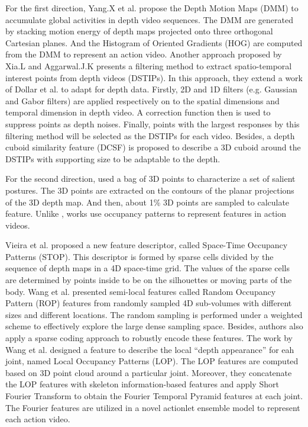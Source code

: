 \documentclass[final,3p,times,twocolumn]{elsarticle}
\begin{document}
For the first direction, Yang.X et al. \cite{yang2012recognizing} propose the Depth Motion Maps (DMM) to accumulate global activities in depth video sequences. The DMM are generated by stacking motion energy of depth maps projected onto three orthogonal Cartesian planes. And the Histogram of Oriented Gradients (HOG) \cite{dalal2005histograms} are computed from the DMM to represent an action video. Another approach proposed by Xia.L and Aggarwal.J.K \cite{xia2013spatio} presents a filtering method to extract spatio-temporal interest points from depth videos (DSTIPs). In this approach, they extend a work of Dollar et al. \cite{dollar2005behavior} to adapt for depth data. Firstly, 2D and 1D filters (e.g. Gaussian and Gabor filters) are applied respectively on to the spatial dimensions and temporal dimension in depth video. A correction function then is used to suppress points as depth noises. Finally, points with the largest responses by this filtering method will be selected as the DSTIPs for each video. Besides, a depth cuboid similarity feature (DCSF) is proposed to describe a 3D cuboid around the DSTIPs with supporting size to be adaptable to the depth.

For the second direction, \cite{li2010action} used a bag of 3D points to characterize a set of salient postures. The 3D points are extracted on the contours of the planar projections of the 3D depth map. And then, about 1\% 3D points are sampled to calculate feature. Unlike \cite{li2010action}, works \cite{vieira2012stop, wang2012robust, wang2012mining} use occupancy patterns to represent features in action videos.

Vieira et al. \cite{vieira2012stop} proposed a new feature descriptor, called Space-Time Occupancy Patterns (STOP). This descriptor is formed by sparse cells divided by the sequence of depth maps in a 4D space-time grid. The values of the sparse cells are determined by points inside to be on the silhouettes or moving parts of the body. Wang et al. \cite{wang2012robust} presented semi-local features called Random Occupancy Pattern (ROP) features from randomly sampled 4D sub-volumes with different sizes and different locations. The random sampling is performed under a weighted scheme to effectively explore the large dense sampling space. Besides, authors also apply a sparse coding approach to robustly encode these features. The work by Wang et al. \cite{wang2012mining} designed a feature to describe the local ``depth appearance'' for eah joint, named Local Occupancy Patterns (LOP). The LOP features are computed based on 3D point cloud around a particular joint. Moreover, they concatenate the LOP features with skeleton information-based features and apply Short Fourier Transform to obtain the Fourier Temporal Pyramid features at each joint. The Fourier features are utilized in a novel actionlet ensemble model to represent each action video.
\end{document}
